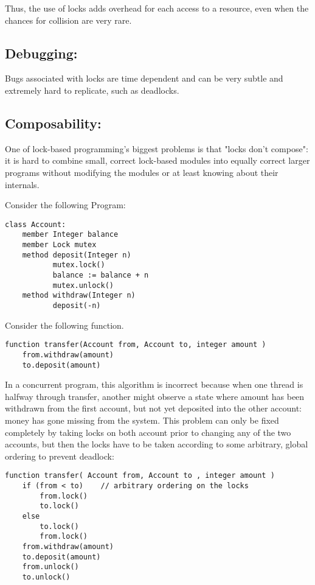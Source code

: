 \documentclass[a4paper]{article}
\begin{document}
    Thus, the use of locks adds overhead for each access to a resource, even when the chances for collision are very rare.

\subsection{Debugging:}

Bugs associated with locks are time dependent and can be very subtle and extremely hard to replicate, such as deadlocks.

\subsection{Composability:}

One of lock-based programming's biggest problems is that "locks don't compose": it is hard to combine small, correct lock-based modules into equally correct larger programs without modifying the modules or at least knowing about their internals. 

Consider the following Program:

\begin{verbatim}
class Account:
    member Integer balance 
    member Lock mutex 
    method deposit(Integer n)
           mutex.lock()
           balance := balance + n
           mutex.unlock()
    method withdraw(Integer n)
           deposit(-n)
\end{verbatim}

Consider the following function.

\begin{verbatim}
function transfer(Account from, Account to, integer amount )
    from.withdraw(amount)
    to.deposit(amount)
\end{verbatim}

In a concurrent program, this algorithm is incorrect because when one thread is halfway through transfer, another might observe a state where amount has been withdrawn from the first account, but not yet deposited into the other account: money has gone missing from the system. This problem can only be fixed completely by taking locks on both account prior to changing any of the two accounts, but then the locks have to be taken according to some arbitrary, global ordering to prevent deadlock:

\begin{verbatim}
function transfer( Account from, Account to , integer amount )
    if (from < to)    // arbitrary ordering on the locks
        from.lock()
        to.lock()
    else
        to.lock()
        from.lock()
    from.withdraw(amount)
    to.deposit(amount)
    from.unlock()
    to.unlock()
\end{verbatim}
\end{document}
